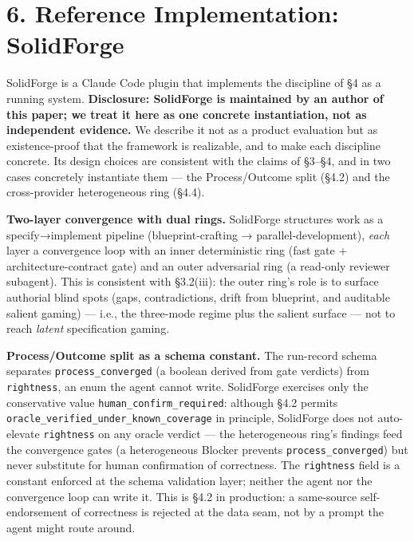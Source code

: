 \documentclass[
  11pt,
]{article}
\begin{document}
\section{6. Reference Implementation:
SolidForge}\label{reference-implementation-solidforge}

SolidForge is a Claude Code plugin that implements the discipline of §4
as a running system. \textbf{Disclosure: SolidForge is maintained by an
author of this paper; we treat it here as one concrete instantiation,
not as independent evidence.} We describe it not as a product evaluation
but as existence-proof that the framework is realizable, and to make
each discipline concrete. Its design choices are consistent with the
claims of §3--§4, and in two cases concretely instantiate them --- the
Process/Outcome split (§4.2) and the cross-provider heterogeneous ring
(§4.4).

\textbf{Two-layer convergence with dual rings.} SolidForge structures
work as a specify→implement pipeline (blueprint-crafting →
parallel-development), \emph{each} layer a convergence loop with an
inner deterministic ring (fast gate + architecture-contract gate) and an
outer adversarial ring (a read-only reviewer subagent). This is
consistent with §3.2(iii): the outer ring's role is to surface authorial
blind spots (gaps, contradictions, drift from blueprint, and auditable
salient gaming) --- i.e., the three-mode regime plus the salient surface
--- not to reach \emph{latent} specification gaming.

\textbf{Process/Outcome split as a schema constant.} The run-record
schema separates \texttt{process\_converged} (a boolean derived from
gate verdicts) from \texttt{rightness}, an enum the agent cannot write.
SolidForge exercises only the conservative value
\texttt{human\_confirm\_required}: although §4.2 permits
\texttt{oracle\_verified\_under\_known\_coverage} in principle,
SolidForge does not auto-elevate \texttt{rightness} on any oracle
verdict --- the heterogeneous ring's findings feed the convergence gates
(a heterogeneous Blocker prevents \texttt{process\_converged}) but never
substitute for human confirmation of correctness. The \texttt{rightness}
field is a constant enforced at the schema validation layer; neither the
agent nor the convergence loop can write it. This is §4.2 in production:
a same-source self-endorsement of correctness is rejected at the data
seam, not by a prompt the agent might route around.
\end{document}
